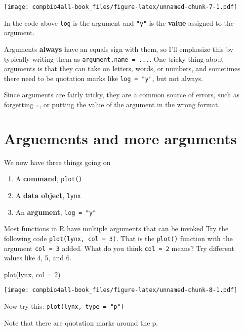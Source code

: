 \documentclass[
]{book}
\newenvironment{Shaded}{\begin{snugshade}}{\end{snugshade}}
\newcommand{\AttributeTok}[1]{\textcolor[rgb]{0.77,0.63,0.00}{#1}}
\newcommand{\DecValTok}[1]{\textcolor[rgb]{0.00,0.00,0.81}{#1}}
\newcommand{\FunctionTok}[1]{\textcolor[rgb]{0.00,0.00,0.00}{#1}}
\newcommand{\NormalTok}[1]{#1}
\providecommand{\tightlist}{%
  \setlength{\itemsep}{0pt}\setlength{\parskip}{0pt}}
\begin{document}
\texttt{[image: compbio4all-book\_files/figure-latex/unnamed-chunk-7-1.pdf]}

In the code above \texttt{log} is the argument and \texttt{"y"} is the \textbf{value} assigned to the argument.

Arguments \textbf{always} have an equals sign with them, so I'll emphasize this by typically writing them as \texttt{argument.name\ =\ ...}. One tricky thing about arguments is that they can take on letters, words, or numbers, and sometimes there need to be quotation marks like \texttt{log\ =\ "y"}, but not always.

Since arguments are fairly tricky, they are a common source of errors, such as forgetting \texttt{=}, or putting the value of the argument in the wrong format.

\hypertarget{arguements-and-more-arguments}{%
\section{Arguements and more arguments}\label{arguements-and-more-arguments}}

We now have three things going on

\begin{enumerate}
\def\labelenumi{\arabic{enumi}.}
\tightlist
\item
  A \textbf{command}, \texttt{plot()}
\item
  A \textbf{data object}, \texttt{lynx}
\item
  An \textbf{argument}, \texttt{log\ =\ "y"}
\end{enumerate}

Most functions in R have multiple arguments that can be invoked Try the following code \texttt{plot(lynx,\ col\ =\ 3)}. That is the \texttt{plot()} function with the argument \texttt{col\ =\ 3} added. What do you think \texttt{col\ =\ 2} means? Try different values like 4, 5, and 6.

\begin{Shaded}
\begin{Highlighting}[]
\FunctionTok{plot}\NormalTok{(lynx, }\AttributeTok{col =} \DecValTok{2}\NormalTok{)}
\end{Highlighting}
\end{Shaded}

\texttt{[image: compbio4all-book\_files/figure-latex/unnamed-chunk-8-1.pdf]}

Now try this: \texttt{plot(lynx,\ type\ =\ "p")}

Note that there are quotation marks around the p.
\end{document}
